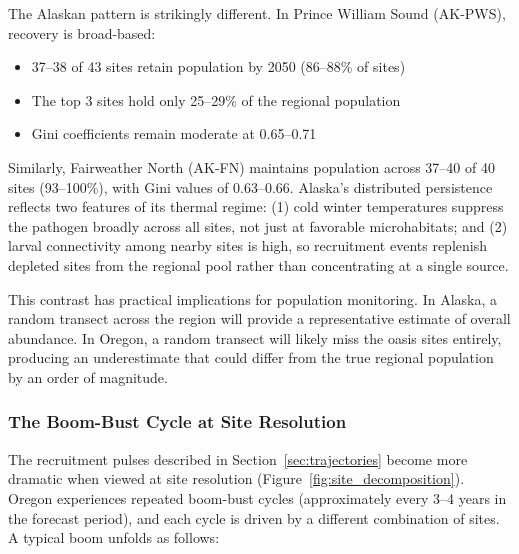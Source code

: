The Alaskan pattern is strikingly different.  In Prince William Sound (AK-PWS),
recovery is broad-based:

\begin{itemize}
  \item 37--38 of 43 sites retain population by 2050 (86--88\% of sites)
  \item The top 3 sites hold only 25--29\% of the regional population
  \item Gini coefficients remain moderate at 0.65--0.71
\end{itemize}

\noindent
Similarly, Fairweather North (AK-FN) maintains population across 37--40 of 40
sites (93--100\%), with Gini values of 0.63--0.66.  Alaska's distributed
persistence reflects two features of its thermal regime: (1) cold winter
temperatures suppress the pathogen broadly across all sites, not just at
favorable microhabitats; and (2) larval connectivity among nearby sites is
high, so recruitment events replenish depleted sites from the regional pool
rather than concentrating at a single source.

This contrast has practical implications for population monitoring.  In Alaska,
a random transect across the region will provide a representative estimate of
overall abundance.  In Oregon, a random transect will likely miss the oasis
sites entirely, producing an underestimate that could differ from the true
regional population by an order of magnitude.

\subsubsection{The Boom-Bust Cycle at Site Resolution}

The recruitment pulses described in Section~\ref{sec:trajectories} become
more dramatic when viewed at site resolution
(Figure~\ref{fig:site_decomposition}).  Oregon experiences repeated
boom-bust cycles (approximately every 3--4 years in the forecast period), and
each cycle is driven by a different combination of sites.  A typical boom
unfolds as follows:


